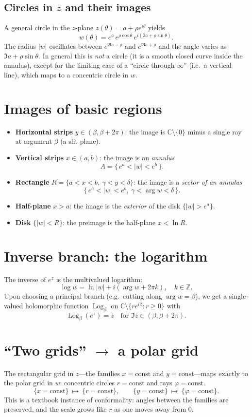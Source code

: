 \documentclass[11pt]{article}
\DeclareMathOperator{\Log}{Log}
\begin{document}
\subsection*{Circles in $z$ and their images}
A general circle in the $z$-plane $z(\theta)=a+\rho e^{i\theta}$ yields
\[
w(\theta)=e^{a}\,e^{\rho\cos\theta}\,e^{i(\Im a+\rho\sin\theta)}.
\]
The radius $|w|$ oscillates between $e^{\Re a-\rho}$ and $e^{\Re a+\rho}$ and the angle varies as $\Im a+\rho\sin\theta$. In general this is \emph{not} a circle (it is a smooth closed curve inside the annulus), except for the limiting case of a “circle through $\infty$” (i.e.\ a vertical line), which maps to a concentric circle in $w$.

\section*{Images of basic regions}
\begin{itemize}
	\item \textbf{Horizontal strips} $y\in(\beta,\beta+2\pi)$: the image is $\mathbb{C}\setminus\{0\}$ minus a single ray at argument $\beta$ (a slit plane).
	\item \textbf{Vertical strips} $x\in(a,b)$: the image is an \emph{annulus}
	\[
	A=\{\, e^{a}<|w|<e^{b}\,\}.
	\]
	\item \textbf{Rectangle} $R=\{a<x<b,\ \gamma<y<\delta\}$: the image is a \emph{sector of an annulus}
	\[
	\{\, e^{a}<|w|<e^{b},\ \gamma<\arg w<\delta \,\}.
	\]
	\item \textbf{Half-plane} $x>a$: the image is the \emph{exterior} of the disk $\{|w|>e^{a}\}$.
	\item \textbf{Disk} $\{|w|<R\}$: the preimage is the half-plane $x<\ln R$.
\end{itemize}

\section*{Inverse branch: the logarithm}
The inverse of $e^{z}$ is the multivalued logarithm:
\[
\log w=\ln|w|+i(\arg w + 2\pi k),\quad k\in\mathbb{Z}.
\]
Upon choosing a principal branch (e.g.\ cutting along $\arg w=\beta$), we get a single-valued holomorphic function $\Log_{\beta}$ on $\mathbb{C}\setminus\{re^{i\beta}:r\ge 0\}$ with
\[
\Log_{\beta}(e^{z})=z \quad \text{for } \Im z\in(\beta,\beta+2\pi).
\]

\section*{“Two grids” $\to$ a polar grid}
The rectangular grid in $z$—the families $x=\text{const}$ and $y=\text{const}$—maps exactly to the polar grid in $w$: concentric circles $r=\text{const}$ and rays $\varphi=\text{const}$.
\[
\{x=\text{const}\}\ \mapsto\ \{r=\text{const}\},\qquad
\{y=\text{const}\}\ \mapsto\ \{\varphi=\text{const}\}.
\]
This is a textbook instance of conformality: angles between the families are preserved, and the scale grows like $r$ as one moves away from $0$.
\end{document}
